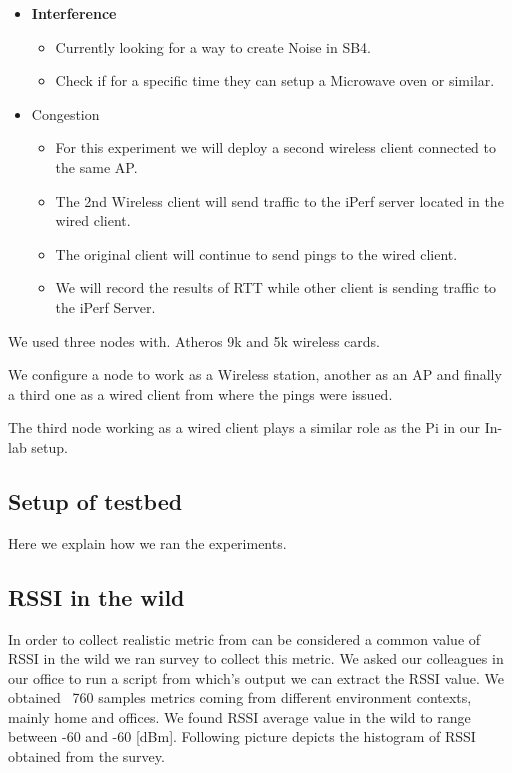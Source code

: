 \begin{itemize}
	\item \textbf{Interference}
	\begin{itemize}
		\item Currently looking for a way to create Noise in SB4.
		\item Check if for a specific time they can setup a Microwave oven or similar.
		
	\end{itemize}
	
	
	
	\item Congestion
	\begin{itemize}
		\item For this experiment we will deploy a second wireless client connected to the same AP.
		\item The 2nd Wireless client will send traffic to the iPerf server located in the wired client.
		\item The original client will continue to send pings to the wired client.
		\item We will record the results of RTT while other client is sending traffic to the iPerf Server.
		
	\end{itemize}
	
	
\end{itemize}


We used three nodes with.
Atheros 9k and 5k wireless cards.

We configure a node to work as a Wireless station, another as an AP and finally a third one as a wired client from where the pings were issued.

The third node working as a wired client plays a similar role as the Pi in our In-lab setup.


\subsection{Setup of testbed}

Here we explain how we ran the experiments.

\subsection{RSSI in the wild}

In order to collect realistic metric from can be considered a common value of RSSI in the wild we ran survey to collect this metric. We asked our colleagues in our office to run a script from which's output we can extract the RSSI value. We obtained ~760 samples metrics coming from different environment contexts,  mainly home and offices. We found RSSI average value in the wild to range between -60 and -60 [dBm]. Following picture depicts the histogram of RSSI obtained from the survey.

